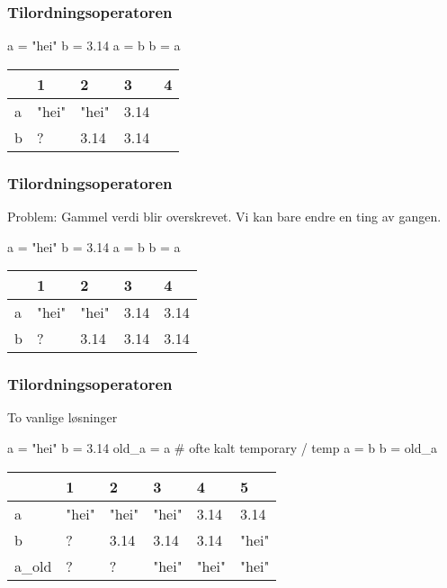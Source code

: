 \begin{frame}[fragile] 
	\frametitle{Tilordningsoperatoren} 
\begin{python}
a = "hei"
b = 3.14
a = b
b = a
\end{python}

\begin{table}[]
    \begin{tabular}{|l|l|l|l|l|}
    \hline
      & 1       & 2     & 3     & 4 
    \\ \hline
    a & "hei"   & "hei" & 3.14  & 
    \\ \hline
    b & ?       & 3.14  & 3.14  & 
    \\ \hline
    \end{tabular}
\end{table}

\end{frame} 

\begin{frame}[fragile] 
    \frametitle{Tilordningsoperatoren} 
    
    Problem: Gammel verdi blir overskrevet. Vi kan bare endre en ting av gangen. 

\begin{python}
a = "hei"
b = 3.14
a = b
b = a
\end{python}

\begin{table}[]
    \begin{tabular}{|l|l|l|l|l|}
    \hline
      & 1       & 2     & 3     & 4 
    \\ \hline
    a & "hei"   & "hei" & 3.14  & 3.14 
    \\ \hline
    b & ?       & 3.14  & 3.14  & 3.14 
    \\ \hline
    \end{tabular}
\end{table}

\end{frame} 

\begin{frame}[fragile]
    \frametitle{Tilordningsoperatoren}

    To vanlige løsninger

\begin{python}[fragile]
a = "hei"
b = 3.14
old_a = a   # ofte kalt temporary / temp
a = b
b = old_a
\end{python}

\begin{table}[]
    \begin{tabular}{|l|l|l|l|l|l|}
    \hline
           & 1     & 2     & 3     & 4     & 5     \\ \hline
    a      & "hei" & "hei" & "hei" & 3.14  & 3.14  \\ \hline
    b      & ?     & 3.14  & 3.14  & 3.14  & "hei" \\ \hline
    a\_old & ?     & ?     & "hei" & "hei" & "hei" \\ \hline
    \end{tabular}
\end{table}

\end{frame}

